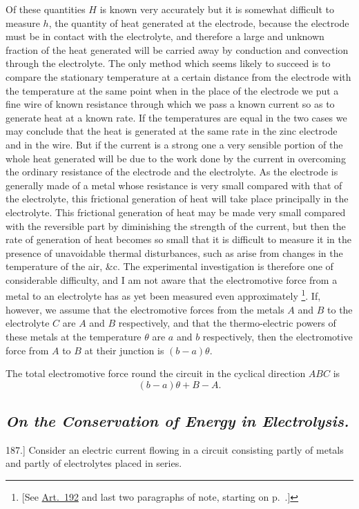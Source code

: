 \documentclass[12pt,oneside]{book}[2021/10/04]
\let\oldfootnote\footnote
\renewcommand\footnote[1]{%
\oldfootnote{\hspace{0.14em}#1}}
\newcommand{\Heading}{\centering\normalfont}
\newcommand{\Subsection}[1]{\subsection*{\normalsize\Heading\itshape #1}}
\newcommand{\Runhead}[1]{\fancyhead[C]{\iffloatpage{}{\small#1}}}
\newcommand{\article}[1]{\phantomsection \label{art:#1}{#1.]}}
\newcommand{\¬}{\hphantom{0}}
\begin{document}
Of these quantities \(H\) is known very accurately but it is somewhat
difficult to measure \(h\), the quantity of heat generated at the
electrode, because the electrode must be in contact with the electrolyte,
and therefore a large and unknown fraction of the heat
generated will be carried away by conduction and convection
through the electrolyte. The only method which seems likely
to succeed is to compare the stationary temperature at a certain
distance from the electrode with the temperature at the same
point when in the place of the electrode we put a fine wire of
known resistance through which we pass a known current so as
to generate heat at a known rate. If the temperatures are equal
in the two cases we may conclude that the heat is generated at the
same rate in the zinc electrode and in the wire. But if the current
is a strong one a very sensible portion of the whole heat generated
will be due to the work done by the current in overcoming the
ordinary resistance of the electrode and the electrolyte. As the electrode
is generally made of a metal whose resistance is very small
compared with that of the electrolyte, this frictional generation of
heat will take place principally in the electrolyte. This frictional
generation of heat may be made very small compared with the
reversible part by diminishing the strength of the current, but then
the rate of generation of heat becomes so small that it is difficult
to measure it in the presence of unavoidable thermal disturbances,
such as arise from changes in the temperature of the air, \&c. The
experimental investigation is therefore one of considerable difficulty,
and I am not aware that the electromotive force from a metal to an
electrolyte has as yet been measured even approximately\footnote{
[See \hyperref[art:192]{Art.\ 192} and last two paragraphs of note, starting on p.\ \pageref{note:192}.]}. If, however,
we assume that the electromotive forces from the metals \(A\)
and \(B\) to the electrolyte \(C\) are \(A\) and \(B\) respectively, and that the
thermo-electric powers of these metals at the temperature \(\theta\) are \(a\)
and \(b\) respectively, then the electromotive force from \(A\) to \(B\) at
their junction is \((b-a)\theta\).

The total electromotive force round the circuit in the cyclical
direction \(ABC\) is
\[
(b-a)\theta+B-A\text{.}
\]
\Runhead{MEASUREMENT OF ELECTROMOTIVE FORCE.}

\Subsection{On the Conservation of Energy in Electrolysis.}

\article{187} Consider an electric current flowing in a circuit consisting
partly of metals and partly of electrolytes placed in series.
\end{document}
